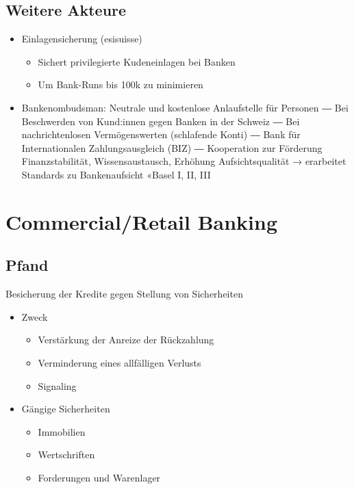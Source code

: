 \subsection{Weitere Akteure}
\begin{itemize}
    \item Einlagensicherung (esisuisse)
    \begin{itemize}
        \item Sichert privilegierte Kudeneinlagen bei Banken
        \item Um Bank-Runs bis 100k zu minimieren
    \end{itemize}
    \item Bankenombudsman: Neutrale und kostenlose Anlaufstelle für Personen
    ― Bei Beschwerden von Kund:innen gegen Banken in der Schweiz
    ― Bei nachrichtenlosen Vermögenswerten (schlafende Konti)
    ― Bank für Internationalen Zahlungsausgleich (BIZ)
    ― Kooperation zur Förderung Finanzstabilität, Wissensaustausch, Erhöhung Aufsichtsqualität
    → erarbeitet Standards zu Bankenaufsicht «Basel I, II, III
\end{itemize}


\section{Commercial/Retail Banking}


\subsection{Pfand}
Besicherung der Kredite gegen Stellung von Sicherheiten

\begin{itemize}
    \item Zweck
    \begin{itemize}
        \item Verstärkung der Anreize der Rückzahlung
        \item Verminderung eines allfälligen Verlusts
        \item Signaling
    \end{itemize}
    \item Gängige Sicherheiten
    \begin{itemize}
        \item Immobilien
        \item Wertschriften
        \item Forderungen und Warenlager 
    \end{itemize}
\end{itemize}

